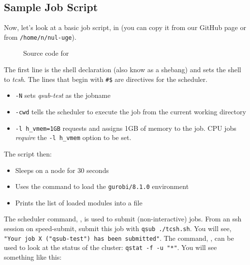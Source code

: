 \documentclass{easychair}
\begin{document}
\subsection{Sample Job Script}

Now, let's look at a basic job script,  in 
(you can copy it from our GitHub page or from \texttt{/home/n/nul-uge}).

\begin{figure}[htpb]
	
	\caption{Source code for }
	\label{fig:tcsh.sh}
\end{figure}

The first line is the shell declaration (also know as a shebang) and sets the shell to \emph{tcsh}.
The lines that begin with \texttt{\#\$} are directives for the scheduler.

\begin{itemize}
	\item \texttt{-N} sets \emph{qsub-test} as the jobname
	\item \texttt{-cwd} tells the scheduler to execute the job from the current working directory
	\item \texttt{-l h\_vmem=1GB} requests and assigns 1GB of memory to the job. CPU jobs \emph{require} the \texttt{-l h\_vmem} option to be set.
\end{itemize}

The script then:

\begin{itemize}
	\item Sleeps on a node for 30 seconds
	\item Uses the  command to load the \texttt{gurobi/8.1.0} environment
	\item Prints the list of loaded modules into a file
\end{itemize}

The scheduler command, , is used to submit (non-interactive) jobs. 
From an ssh session on speed-submit, submit this job with \texttt{qsub ./tcsh.sh}. You will see,
\texttt{"Your job X ("qsub-test") has been submitted"}. The command, , can be used 
to look at the status of the cluster: \texttt{qstat -f -u "*"}. You will see 
something like this: 
\end{document}
